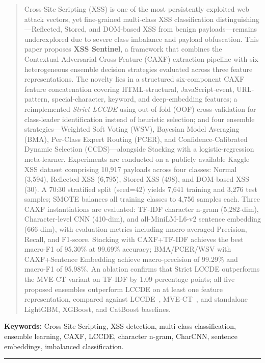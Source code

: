\documentclass[11pt,a4paper]{article}
\begin{document}
\begin{abstract}
\noindent
Cross-Site Scripting (XSS) is one of the most persistently exploited web attack vectors, yet
fine-grained multi-class XSS classification distinguishing ---Reflected, Stored, and DOM-based XSS
from benign payloads---remains underexplored due to severe class imbalance and payload obfuscation.
This paper proposes \textbf{XSS Sentinel}, a framework that combines the
Contextual-Adversarial Cross-Feature (CAXF) extraction pipeline with six heterogeneous
ensemble decision strategies evaluated across three feature representations.
The novelty lies in a structured six-component CAXF feature concatenation covering HTML-structural,
JavaScript-event, URL-pattern, special-character, keyword, and deep-embedding features; a reimplemented
\textit{Strict LCCDE} using out-of-fold (OOF) cross-validation for class-leader identification instead
of heuristic selection; and four ensemble strategies---Weighted Soft Voting (WSV), Bayesian Model Averaging (BMA), Per-Class Expert Routing (PCER), and Confidence-Calibrated Dynamic Selection
(CCDS)---alongside Stacking with a logistic-regression meta-learner.
Experiments are conducted on a publicly available Kaggle XSS dataset comprising 10,917 payloads
across four classes: Normal (3,594), Reflected XSS (6,795), Stored XSS (498), and DOM-based XSS (30).
A 70:30 stratified split (seed=42) yields 7,641 training and 3,276 test samples; SMOTE balances all
training classes to 4,756 samples each. Three CAXF instantiations are evaluated: TF-IDF character
n-gram (5,282-dim), Character-level CNN (410-dim), and all-MiniLM-L6-v2 sentence embedding (666-dim),
with evaluation metrics including macro-averaged Precision, Recall, and F1-score. Stacking with
CAXF+TF-IDF achieves the best macro-F1 of 95.30\% at 99.69\% accuracy; BMA/PCER/WSV with
CAXF+Sentence Embedding achieve macro-precision of 99.29\% and macro-F1 of 95.98\%. An ablation
confirms that Strict LCCDE outperforms the MVE-CT variant on TF-IDF by 1.09 percentage points;
all five proposed ensembles outperform LCCDE on at least one feature representation, compared against
LCCDE~\cite{lccde2022}, MVE-CT~\cite{hua2025caxf}, and standalone LightGBM, XGBoost, and CatBoost baselines.
\end{abstract}

\textbf{Keywords:} Cross-Site Scripting, XSS detection, multi-class classification,
ensemble learning, CAXF, LCCDE, character n-gram, CharCNN, sentence embeddings, imbalanced classification.

\vspace{1em}
\hrule height 0.4pt
\vspace{1em}
\end{document}
